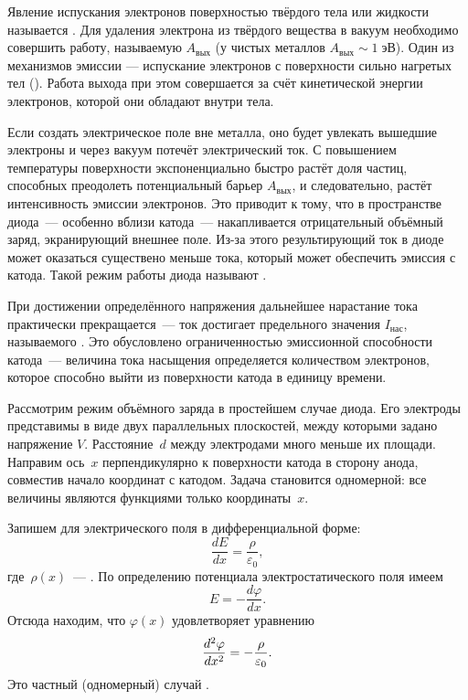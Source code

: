 Явление испускания электронов поверхностью твёрдого тела или жидкости называется
. Для удаления электрона из твёрдого вещества в
вакуум необходимо совершить работу, называемую  $A_{вых}$
(у чистых металлов $A_{вых}\sim 1\;эВ$).
Один из механизмов эмиссии --- испускание электронов с поверхности сильно
нагретых тел (). Работа выхода при этом
совершается за счёт кинетической энергии электронов, которой они обладают
внутри тела.

Если создать электрическое поле вне металла, оно будет увлекать вышедшие
электроны и через вакуум потечёт электрический ток.
С повышением температуры поверхности экспоненциально быстро растёт доля частиц,
способных преодолеть потенциальный барьер $A_{вых}$, и следовательно, растёт
интенсивность эмиссии электронов. Это приводит к тому, что в пространстве
диода~--- особенно вблизи катода~--- накапливается отрицательный
объёмный заряд, экранирующий внешнее поле. Из-за этого результирующий ток
в диоде может оказаться существено меньше тока, который может обеспечить эмиссия
с катода. Такой режим работы диода называют .

При достижении определённого напряжения дальнейшее нарастание тока практически
прекращается~--- ток достигает предельного значения $I_{нас}$, называемого
. Это обусловлено ограниченностью эмиссионной способности
катода~--- величина тока насыщения определяется количеством электронов,
которое способно выйти из поверхности катода в единицу времени.


Рассмотрим режим объёмного заряда в простейшем случае 
диода. Его электроды представимы в виде двух параллельных плоскостей,
между которыми задано напряжение $V$. Расстояние~$d$ между электродами много
меньше их площади. Направим ось~$x$ перпендикулярно к поверхности катода
в сторону анода, совместив начало координат с катодом. Задача
становится одномерной: все величины являются функциями только координаты~$x$.

Запишем для электрического поля  в дифференциальной
форме:
\[
\frac{dE}{dx} = \frac{\rho}{\varepsilon_0},
\]
где~$\rho(x)$~--- . По определению
потенциала электростатического поля имеем
\[
E = -\frac{d\varphi}{dx}.
\]
Отсюда находим, что $\varphi(x)$ удовлетворяет уравнению
\begin{equation}
    \eqmark{3.14}
    \frac{d^2\varphi}{dx^2}=-\frac{\rho}{\varepsilon_0}.
\end{equation}
Это частный (одномерный) случай .

